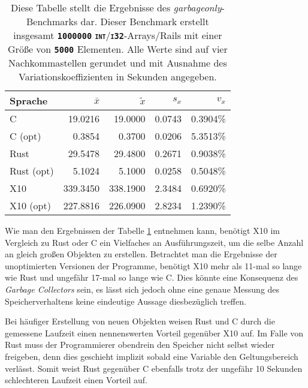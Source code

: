 \begin{table}
	\begin{center}
		\begin{tabular}{lrrrr}
			\toprule
			Sprache    & $\bar{x}$ & $\tilde{x}$ & $s_x$ & $v_x$ \\
			\midrule
			C          &  19.0216 &  19.0000 & 0.0743 & 0.3904\%  \\
			C (opt)    &   0.3854 &   0.3700 & 0.0206 & 5.3513\%  \\
			Rust       &  29.5478 &  29.4800 & 0.2671 & 0.9038\%  \\
			Rust (opt) &   5.1024 &   5.1000 & 0.0258 & 0.5048\%  \\
			X10        & 339.3450 & 338.1900 & 2.3484 & 0.6920\%  \\
			X10 (opt)  & 227.8816 & 226.0900 & 2.8234 & 1.2390\%  \\
			\bottomrule
		\end{tabular}
	\end{center}
	\caption{
		Diese Tabelle stellt die Ergebnisse des \textit{garbageonly}-Benchmarks dar. Dieser Benchmark erstellt insgesamt
		\texttt{\textsc{\textbf{1000000}}} \texttt{\textsc{\textbf{int}}}/\texttt{\textsc{\textbf{i32}}}-Arrays/Rails
		mit einer Größe von \texttt{\textsc{\textbf{5000}}} Elementen.
		Alle Werte sind auf vier Nachkommastellen gerundet und mit Ausnahme des Variationskoeffizienten
		in Sekunden angegeben.
	}
	\label{fig:garbageonly_table}
\end{table}

Wie man den Ergebnissen der Tabelle \ref{fig:garbageonly_table} entnehmen kann,
benötigt X10 im Vergleich zu Rust oder C ein Vielfaches an Ausführungszeit, um die selbe Anzahl an gleich großen
Objekten zu erstellen. Betrachtet man die Ergebnisse der unoptimierten Versionen der Programme, benötigt X10
mehr als 11-mal so lange wie Rust und ungefähr 17-mal so lange wie C.
Dies könnte eine Konsequenz des \textit{Garbage Collectors} sein, es lässt sich jedoch ohne eine genaue Messung des
Speicherverhaltens keine eindeutige Aussage diesbezüglich treffen.

Bei häufiger Erstellung von neuen Objekten weisen Rust und C durch die gemessene Laufzeit
einen nennenswerten Vorteil gegenüber X10 auf. Im Falle von Rust muss der Programmierer obendrein
den Speicher nicht selbst wieder freigeben, denn dies geschieht implizit sobald eine Variable
den Geltungsbereich verlässt. Somit weist Rust gegenüber C ebenfalls trotz der ungefähr 10 Sekunden schlechteren Laufzeit
einen Vorteil auf.

